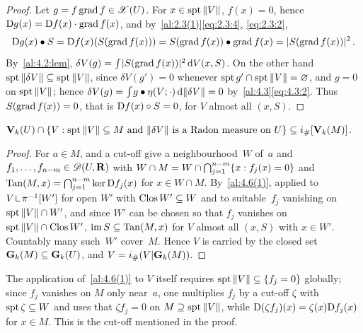 \begin{proof}
    Let $g = f \operatorname{grad} f \in \mathscr{X}(U)$. For $x \in \operatorname{spt} \|V\|$, $f(x) = 0$, hence $\mathrm{D} g(x) = \mathrm{D} f(x)
    \cdot \operatorname{grad} f(x)$, and by~\ref{al:2.3(1)}\eqref{eq:2.3:4}, \eqref{eq:2.3:2},
    \begin{displaymath}
        \mathrm{D} g(x) \bullet S = \mathrm{D} f(x)(S(\operatorname{grad} f(x))) = S(\operatorname{grad} f(x)) \bullet \operatorname{grad} f(x) = |S(\operatorname{grad}
        f(x))|^2 \,.
    \end{displaymath}
    By~\ref{al:4.2:lem}, $\delta V(g) = {\textstyle\int_{}^{}} |S(\operatorname{grad} f(x))|^2 \,\mathrm{d} V(x,S)$. On the other
    hand $\operatorname{spt} \|\delta V\| \subseteq \operatorname{spt} \|V\|$, since $\delta V(g') = 0$ whenever $\operatorname{spt} g' \cap
    \operatorname{spt} \|V\| = \varnothing$, and $g = 0$ on $\operatorname{spt} \|V\|$; hence $\delta V(g) = {\textstyle\int_{}^{}} g
    \bullet \eta(V;\cdot) \,\mathrm{d} \|\delta V\| = 0$ by~\ref{al:4.3}\eqref{eq:4.3:2}. Thus $S(\operatorname{grad}
    f(x)) = 0$, that is $\mathrm{D} f(x) \circ S = 0$, for $V$ almost all $(x,S)$.
\end{proof}

\begin{corollary}
    \label{al:4.6(2)}
    $\mathbf{V}_{k}(U) \cap \{ V : \operatorname{spt} \|V\| \subseteq M \text{ and } \|\delta V\| \text{ is a Radon
    measure on } U \} \subseteq i_\# [\mathbf{V}_{k}(M)]$.
\end{corollary}

\begin{proof}
    For $a \in M$, \cite[3.1.19(2)]{Federer1969} and a cut-off give a neighbourhood~$W$ of~$a$
    and $f_1, \ldots, f_{n-m} \in \mathscr{D}(U,\mathbf{R})$ with $W \cap M = W \cap {{\textstyle \bigcap}}_{j=1}^{n-m}
    \{ x : f_j(x) = 0 \}$ and $\operatorname{Tan}(M,x) = {{\textstyle \bigcap}}_{j=1}^{n-m} \ker \mathrm{D} f_j(x)$ for $x \in W
    \cap M$. By~\ref{al:4.6(1)}, applied to $V \restrict \pi^{-1}[W']$ for open $W'$ with $\mathop{\mathrm{Clos}}W' \subseteq W$ and to suitable~$f_j$ vanishing on $\operatorname{spt} \|V\| \cap W'$, and since $W'$ can
    be chosen so that $f_j$ vanishes on $\operatorname{spt} \|V\| \cap \mathop{\mathrm{Clos}}W'$, $\operatorname{im} S \subseteq \operatorname{Tan}(M,x)$
    for $V$ almost all $(x,S)$ with $x \in W'$. Countably many such~$W'$ cover~$M$. Hence $V$ is
    carried by the closed set $\mathbf{G}_{k}(M) \subseteq \mathbf{G}_{k}(U)$, and $V = i_\#(V | \mathbf{G}_{k}(M))$.
\end{proof}

\begin{remark}
    \label{rem:4.6(2)}
    The application of~\ref{al:4.6(1)} to $V$ itself requires $\operatorname{spt} \|V\| \subseteq \{ f_j = 0
    \}$ globally; since $f_j$ vanishes on $M$ only near~$a$, one multiplies $f_j$ by a cut-off
    $\zeta$ with $\operatorname{spt} \zeta \subseteq W$ and uses that $\zeta f_j = 0$ on $M \supseteq \operatorname{spt}
    \|V\|$, while $\mathrm{D}(\zeta f_j)(x) = \zeta(x) \mathrm{D} f_j(x)$ for $x \in M$. This is the cut-off
    mentioned in the proof.
\end{remark}

